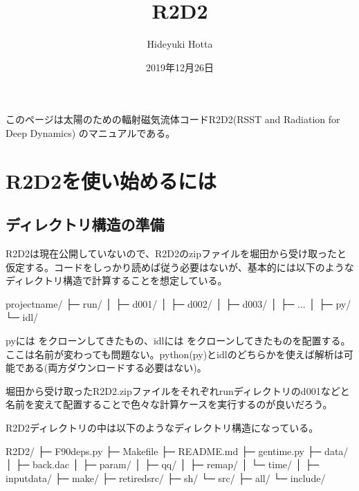 \documentclass[letterpaper,10pt,dvipdfmx,report]{sphinxmanual}
\title{R2D2}
\date{2019年12月26日}
\author{Hideyuki Hotta}
\let\sphinxpxdimen\pdfpxdimen\else\newdimen\sphinxpxdimen
\begin{document}
\pagestyle{empty}
\sphinxmaketitle
\pagestyle{plain}
\sphinxtableofcontents
\pagestyle{normal}
\label{\detokenize{index::doc}}


このページは太陽のための輻射磁気流体コードR2D2(RSST and Radiation for Deep Dynamics)
のマニュアルである。


\noindent\sphinxincludegraphics[width=350\sphinxpxdimen]{{R2D2_logo}.png}


\chapter{R2D2を使い始めるには}
\label{\detokenize{start:r2d2}}\label{\detokenize{start::doc}}

\section{ディレクトリ構造の準備}
\label{\detokenize{start:id1}}
R2D2は現在公開していないので、R2D2のzipファイルを堀田から受け取ったと仮定する。コードをしっかり読めば従う必要はないが、基本的には以下のようなディレクトリ構造で計算することを想定している。

\begin{sphinxVerbatim}[commandchars=\\\{\}]
project\PYGZus{}name/
           ├─ run/
           │    ├─ d001/
           │    ├─ d002/
           │    ├─ d003/
           │    ├─ ...
           │
           ├─ py/
           └─ idl/
\end{sphinxVerbatim}

pyには  をクローンしてきたもの、idlには  をクローンしてきたものを配置する。ここは名前が変わっても問題ない。python(py)とidlのどちらかを使えば解析は可能である(両方ダウンロードする必要はない)。

堀田から受け取ったR2D2.zipファイルをそれぞれrunディレクトリのd001などと名前を変えて配置することで色々な計算ケースを実行するのが良いだろう。

R2D2ディレクトリの中は以下のようなディレクトリ構造になっている。

\begin{sphinxVerbatim}[commandchars=\\\{\}]
R2D2/
   ├─ F90\PYGZus{}deps.py
   ├─ Makefile
   ├─ README.md
   ├─ gen\PYGZus{}time.py
   ├─ data/
   │    ├─ back.dac
   │    ├─ param/
   │    ├─ qq/
   │    ├─ remap/
   │    └─ time/
   │
   ├─ input\PYGZus{}data/
   ├─ make/
   ├─ retired\PYGZus{}src/
   ├─ sh/
   └─ src/
        ├─ all/
        └─ include/
\end{sphinxVerbatim}
\end{document}
